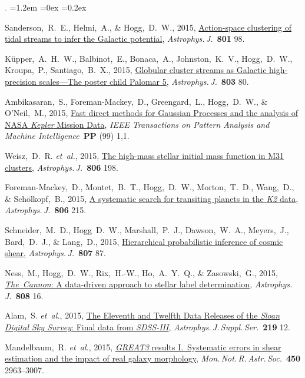 \documentclass[10pt,letterpaper]{article}
\newcommand{\acronym}[1]{{\small{#1}}}
\newcommand{\foreign}[1]{\textsl{#1}}
\newcommand{\etal}{\foreign{et~al.}}
\newcommand{\project}[1]{\textsl{#1}}
\newcommand{\doi}[2]{\href{http://dx.doi.org/#1}{{#2}}}
\newcommand{\deemph}[1]{\textcolor{grey}{\footnotesize{#1}}}
\newcommand{\pubnumber}[1]{\deemph{{#1}.}}
\newcounter{refpubnum}
\newcommand{\hogglist}{%
    \rightmargin=0in
    \leftmargin=1.2em
    \topsep=0ex
    \partopsep=0pt
    \itemsep=0.2ex
    \parsep=0pt
    \itemindent=-1.0\leftmargin
    \listparindent=0.0\leftmargin
    \settowidth{\labelsep}{~}
    \usecounter{refpubnum}
  }
\begin{document}
\begin{list}{\pubnumber{\therefpubnum}}{\hogglist}
\item
Sanderson,~R.~E., Helmi,~A., \& Hogg,~D.~W., 2015,
\doi{10.1088/0004-637X/801/2/98}{Action-space clustering of tidal streams
to infer the Galactic potential},
\textit{Astrophys.\,J.}\ \textbf{801} 98.
\item
K\"upper,~A.~H.~W., Balbinot,~E., Bonaca,~A., Johnston,~K.~V.,
Hogg,~D.~W., Kroupa,~P., Santiago,~B.~X., 2015,
\doi{10.1088/0004-637X/803/2/80}{Globular cluster streams as
Galactic high-precision scales---The poster child Palomar 5},
\textit{Astrophys.\,J.}\ \textbf{803} 80.
\item
Ambikasaran,~S., Foreman-Mackey,~D., Greengard,~L., Hogg,~D.~W., \& O'Neil,~M., 2015,
\doi{10.1109/TPAMI.2015.2448083}{Fast direct methods for Gaussian Processes and the analysis of \acronym{NASA} \project{Kepler} Mission Data},
\textit{IEEE Transactions on Pattern Analysis and Machine Intelligence}\ \textbf{PP} (99) 1,1.
\item
Weisz,~D.~R. \etal, 2015,
\doi{10.1088/0004-637X/806/2/198}{The high-mass stellar initial mass function in M31 clusters},
\textit{Astrophys.\,J.}\ \textbf{806} 198.
\item
Foreman-Mackey,~D., Montet,~B.~T., Hogg,~D.~W., Morton,~T.~D.,
Wang,~D., \& Sch\"olkopf,~B., 2015,
\doi{10.1088/0004-637X/806/2/215}{A systematic search for transiting planets in the \project{K2} data},
\textit{Astrophys.\,J.}\ \textbf{806} 215.
\item
Schneider,~M.~D., Hogg~D.~W., Marshall,~P.~J., Dawson,~W.~A., Meyers,~J.,
Bard,~D.~J., \& Lang,~D., 2015,
\doi{10.1088/0004-637X/807/1/87}{Hierarchical probabilistic inference of cosmic shear},
\textit{Astrophys.\,J.}\ \textbf{807} 87.
\item
Ness,~M., Hogg,~D.~W., Rix,~H.-W., Ho,~A.~Y.~Q., \& Zasowski,~G., 2015,
\doi{10.1088/0004-637X/808/1/16}{\project{The~Cannon}: A data-driven
approach to stellar label determination},
\textit{Astrophys.\,J.}\ \textbf{808} 16.
\item
Alam,~S. \etal, 2015,
\doi{10.1088/0067-0049/219/1/12}{The Eleventh and Twelfth Data Releases of the \project{Sloan Digital Sky Survey}: Final data from \project{\acronym{SDSS-III}}},
\textit{Astrophys.\,J.\,Suppl.\,Ser.}\ \textbf{219} 12.
\item
Mandelbaum,~R. \etal, 2015,
\doi{10.1093/mnras/stv781}{\project{\acronym{GREAT3}} results \acronym{I}.\ Systematic errors in shear
estimation and the impact of real galaxy morphology},
\textit{Mon.\,Not.\,R.\,Astr.\,Soc.}\ \textbf{450} 2963--3007.
\item

\end{list}
\end{document}
